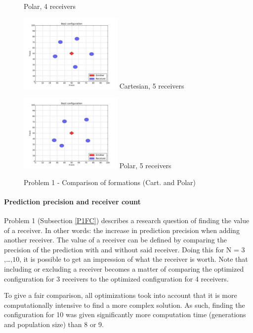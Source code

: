 \documentclass[10pt,a4paper]{book}
\begin{document}
\begin{figure}[H]
\begin{minipage}{50mm}
  Polar, 4 receivers
\end{minipage}
\begin{minipage}{50mm}
  \centering
  \includegraphics[width=50mm]{ConfigurationCart5Recv.jpg}
  Cartesian, 5 receivers
\end{minipage}
\begin{minipage}{50mm}
  \centering
  \includegraphics[width=50mm]{ConfigurationPolar5Recv.jpg}
  Polar, 5 receivers
\end{minipage}
\caption{Problem 1 - Comparison of formations (Cart. and Polar)}
\end{figure}


\paragraph{Prediction precision and receiver count}
\label{PPARC}
Problem 1 (Subsection \ref{P1FC}) describes a research question of finding the value of a receiver. In other words: the increase in prediction precision when adding another receiver. The value of a receiver can be defined by comparing the precision of the prediction with and without said receiver. Doing this for N = $3$,\ldots,$10$, it is possible to get an impression of what the receiver is worth. Note that including or excluding a receiver becomes a matter of comparing the optimized configuration for 3 receivers to the optimized configuration for 4 receivers. 

To give a fair comparison, all optimizations took into account that it is more computationally intensive to find a more complex solution. As such, finding the configuration for 10 was given significantly more computation time (generations and population size) than 8 or 9.
\end{document}
